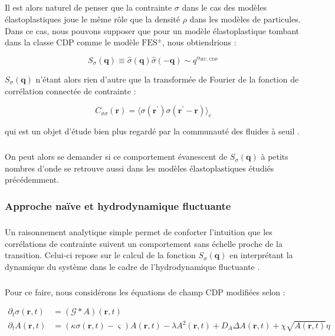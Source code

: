 \subparagraph{}Il est alors naturel de penser que la contrainte $\sigma$ dans le cas des modèles élastoplastiques joue le même rôle que la densité $\rho$ dans les modèles de particules. Dans ce cas, nous pouvons supposer que pour un modèle élastoplastique tombant dans la classe CDP comme le modèle $\text{FES}^\pm$, nous obtiendrions :

\begin{equation}
	S_\sigma(\mathbf{q}) \equiv \hat{\sigma}(\mathbf{q})\hat{\sigma}(\mathbf{-q}) \sim q^{\alpha_\text{HU, CDP}}
\end{equation}

\noindent $S_\sigma(\mathbf{q})$ n'étant alors rien d'autre que la transformée de Fourier de la fonction de corrélation connectée de contrainte :

\begin{equation}
	C_{\sigma\sigma}(\mathbf{r}) = \langle \sigma(\mathbf{r^\prime})\sigma(\mathbf{\mathbf{r}^\prime-\mathbf{r}})\rangle_c
\end{equation}

\noindent qui est un objet d'étude bien plus regardé par la communauté des fluides à seuil \cite{chowdhury_long_2016, maier_emergence_2017, lerner_simple_2020}.

\subparagraph{}On peut alors se demander si ce comportement évanescent de $S_\sigma(\mathbf{q})$ à petits nombres d'onde se retrouve aussi dans les modèles élastoplastiques étudiés précédemment.

\subsubsection{Approche naïve et hydrodynamique fluctuante}

\subparagraph{}Un raisonnement analytique simple permet de conforter l'intuition que les corrélations de contrainte suivent un comportement sans échelle proche de la transition. Celui-ci repose sur le calcul de la fonction $S_\sigma(\mathbf{q})$ en interprétant la dynamique du système dans le cadre de l'hydrodynamique fluctuante \cite{chaikin_principles_1995}. 

\subparagraph{}Pour ce faire, nous considérons les équations de champ CDP modifiées selon :

\begin{equation}
    \begin{aligned}
        \partial_t\sigma(\mathbf{r}, t) &= \left(\mathcal{G}\ast A \right)(\mathbf{r}, t)\\
        \partial_t A(\mathbf{r}, t) &= (\kappa\sigma(\mathbf{r}, t)-\varsigma)A(\mathbf{r}, t)-\lambda A^2(\mathbf{r}, t) + D_A\Delta A(\mathbf{r}, t)
        +\chi \sqrt{A(\mathbf{r}, t)}\eta
    \end{aligned}
\end{equation}

